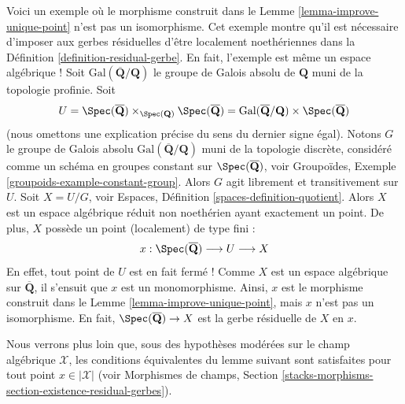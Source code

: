 \begin{example}
\label{example-distinct}
Voici un exemple où le morphisme construit dans le
Lemme \ref{lemma-improve-unique-point}
n'est pas un isomorphisme. Cet exemple montre qu'il est nécessaire d'imposer
aux gerbes résiduelles d'être localement noethériennes dans la
Définition \ref{definition-residual-gerbe}.
En fait, l'exemple est même un espace algébrique !
Soit $\text{Gal}(\overline{\mathbf{Q}}/\mathbf{Q})$ le groupe de
Galois absolu de $\mathbf{Q}$ muni de la topologie profinie.
Soit
$$
U =
\Spec(\overline{\mathbf{Q}})
\times_{\Spec(\mathbf{Q})}
\Spec(\overline{\mathbf{Q}}) =
\text{Gal}(\overline{\mathbf{Q}}/\mathbf{Q}) \times
\Spec(\overline{\mathbf{Q}})
$$
(nous omettons une explication précise du sens du dernier signe égal).
Notons $G$ le groupe de Galois absolu
$\text{Gal}(\overline{\mathbf{Q}}/\mathbf{Q})$ muni de la topologie
discrète, considéré comme un schéma en groupes constant sur
$\Spec(\overline{\mathbf{Q}})$, voir
Groupoïdes, Exemple \ref{groupoids-example-constant-group}.
Alors $G$ agit librement et transitivement sur $U$.
Soit $X = U/G$, voir
Espaces, Définition \ref{spaces-definition-quotient}.
Alors $X$ est un espace algébrique réduit non noethérien ayant exactement un point.
De plus, $X$ possède un point (localement) de type fini :
$$
x :
\Spec(\overline{\mathbf{Q}}) \longrightarrow
U \longrightarrow X
$$
En effet, tout point de $U$ est en fait fermé !
Comme $X$ est un espace algébrique sur $\overline{\mathbf{Q}}$,
il s'ensuit que $x$ est un monomorphisme. Ainsi, $x$ est le morphisme
construit dans le
Lemme \ref{lemma-improve-unique-point},
mais $x$ n'est pas un isomorphisme. En fait,
$\Spec(\overline{\mathbf{Q}}) \to X$ est la gerbe résiduelle de $X$ en $x$.
\end{example}

\noindent
Nous verrons plus loin que, sous des hypothèses modérées sur le champ algébrique
$\mathcal{X}$, les conditions équivalentes du lemme suivant sont satisfaites
pour tout point $x \in |\mathcal{X}|$ (voir Morphismes de champs, Section
\ref{stacks-morphisms-section-existence-residual-gerbes}).

